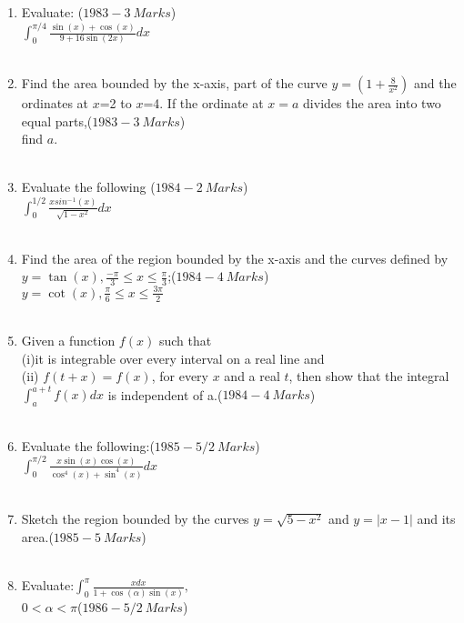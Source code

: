 \documentclass[journal,12pt,twocolumn]{IEEEtran}
\theoremstyle{remark}
\begin{document}
\begin{enumerate}
    \item Evaluate:  \hfill($1983-3\ Marks$)\\$\int_{0}^{\pi/4}\frac{\sin{(x)}+\cos{(x)}}{9+16\sin{(2x)}}dx$\\\\
    \item Find the area bounded by the x-axis, part of the curve $y=(1+\frac{8}{x^2})$ and the ordinates at $x$=2 to $x$=4. If the ordinate at $x=a$ divides the area into two equal parts,\hfill($1983-3\ Marks$)\\find $a$.\\\\
    \item Evaluate the following \hfill($1984-2\ Marks$)\\$\int_{0}^{1/2}\frac{xsin^-{}^1(x)}{\sqrt{1-x^2}}dx$\\\\
    \item Find the area of the region bounded by the x-axis and the curves defined by $y=\tan{(x)}, \frac{-\pi}{3}\leq x \leq\frac{\pi}{3}$;\hfill($1984-4\ Marks$)\\$y=\cot{(x)}, \frac{\pi}{6}\leq x \leq\frac{3\pi}{2}$\\\\
    \item Given a function $f(x)$ such that\\(i)it is integrable over every interval on a real line and\\(ii) $f(t+x)=f(x)$, for every $x$ and a real $t$, then show that the integral$\int_{a}^{a+t}f(x) dx$ is independent of a.\hfill($1984-4\ Marks$)\\\\
    \item Evaluate the following:\hfill($1985-5/2\ Marks$)\\ $\int_{0}^{\pi/2}\frac{x\sin{(x)}\cos{(x)}}{\cos^4{(x)}+\sin^4{(x)}}dx$\\\\
    \item Sketch the region bounded by the curves $y=\sqrt{5-x^2}$ and $y=|x-1|$ and its\\ area.\hfill($1985-5\ Marks$)\\\\
    \item Evaluate:$\int_{0}^{\pi}\frac{xdx}{1+\cos{(\alpha)}\sin{(x)}},$ \\$0<\alpha<\pi$\hfill($1986-5/2\ Marks$)\\\\

\end{enumerate}
\end{document}
